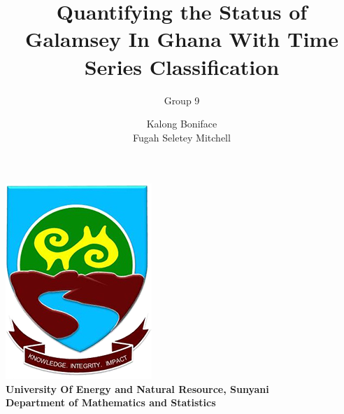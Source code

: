 \documentclass[12pt,a4paper]{article}
\author{Group 9}
\begin{document}
	\title{Quantifying the Status of Galamsey In Ghana With Time Series Classification}
	\author{Kalong Boniface\\ Fugah Seletey Mitchell}
	
	\maketitle
	
	\begin{center}
		\includegraphics{uenrlogo}\\
	\textbf{University Of Energy and Natural Resource, Sunyani\\
	         Department of Mathematics and Statistics
              }
\end{center}
	\newpage
\end{document}
